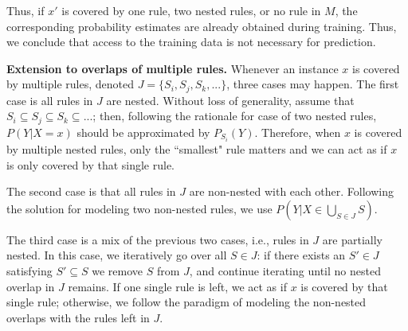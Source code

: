 Thus, if $x'$ is covered by one rule, two nested rules, or no rule in $M$, the corresponding probability estimates are already obtained during training. Thus, we conclude that access to the training data is not necessary for prediction.

\medskip \noindent
\textbf{Extension to overlaps of multiple rules.}
Whenever an instance $x$ is covered by multiple rules, denoted $J = \{S_i, S_j, S_k, ...\}$, three cases may happen. The first case is all rules in $J$ are nested. Without loss of generality, assume that $S_i \subseteq S_j \subseteq S_k \subseteq ...$; then, following the rationale for case of two nested rules, $P(Y|X=x)$ should be approximated by $P_{S_i}(Y)$. 
Therefore, when $x$ is covered by multiple nested rules, only the ``smallest" rule matters and we can act as if $x$ is only covered by that single rule. 

The second case is that all rules in $J$ are non-nested with each other. Following the solution for modeling two non-nested rules, we use $P(Y|X \in \bigcup_{S\in J} S)$. 

The third case is a mix of the previous two cases, i.e., rules in $J$ are partially nested. In this case, we iteratively go over all $S \in J$: if there exists an $S' \in J$ satisfying $S' \subseteq S$ we remove $S$ from $J$, and continue iterating until no nested overlap in $J$ remains. If one single rule is left, we act as if $x$ is covered by that single rule; otherwise, we follow the paradigm of modeling the non-nested overlaps with the rules left in $J$.


